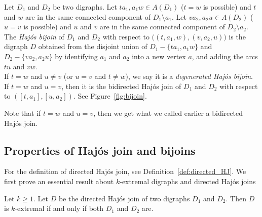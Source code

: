 \begin{definition}\label{def:bijoin}
    Let $D_1$ and $D_2$ be two digraphs. Let $ta_1, a_1w \in A(D_1)$ ($t=w$ is possible) and $t$ and $w$ are in the same connected component of $D_1 \setminus a_1$. Let $va_2,a_2u \in A(D_2)$ ($u=v$ is possible) and $u$ and $v$ are in the same connected component of $D_2 \setminus a_2$. 
    The \emph{Haj\'os bijoin} of $D_1$ and $D_2$ with respect to $\big((t,a_1,w), (v,a_2, u)\big)$ is the digraph $D$ obtained from the disjoint union of $D_1 - \{ta_1, a_1w\}$ and $D_2 - \{va_2, a_2u\}$ by identifying $a_1$ and $a_2$ into a new vertex $a$, and adding the arcs $tu$ and $vw$. \\
    If $t=w$ and $u \neq v$ (or $u=v$ and $t \neq w$), we say it is a \emph{degenerated Haj\'os bijoin}.\\
    If $t=w$ and $u=v$, then it is the bidirected Haj\'os join of $D_1$ and $D_2$ with respect to $([t,a_1], [u,a_2])$. See Figure~\ref{fig:bijoin}.
\end{definition}


Note that if $t=w$ and $u=v$, then we get what we called earlier a bidirected Haj\'os join.

\subsection{Properties of Haj\'os join and bijoins}

For the definition of directed Haj\'os join, see Definition~\ref{def:directed_HJ}. We first prove an essential result about $k$-extremal digraphs and directed Haj\'os joins


\begin{lemma}\label{lem:extremal_directed_Haj}
    Let $k \geq 1$. 
    Let $D$ be the directed Haj\'os join of two digraphs $D_1$ and $D_2$. Then $D$ is $k$-extremal if and only if  both $D_1$ and $D_2$ are.
\end{lemma}

